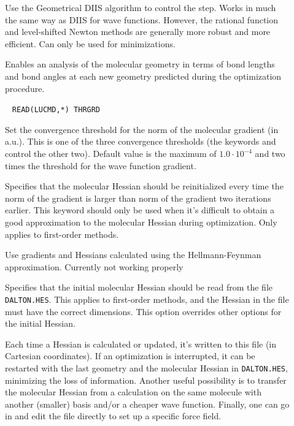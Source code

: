 \begin{description}
\item[]
Use the Geometrical DIIS\cite{pcppjms114}
algorithm to control the
step. Works in much the same way as DIIS for wave functions. However,
the rational function and level-shifted Newton methods are generally
more robust and more efficient. Can only be used for minimizations.

\item[]
Enables an analysis of the molecular geometry in terms of bond lengths
and bond angles at each new geometry predicted during the optimization
procedure.

\item[]\verb| |
\newline
\verb|READ(LUCMD,*) THRGRD|

Set the convergence threshold for the norm of the molecular gradient (in
a.u.). This is one of
the three convergence thresholds (the keywords  and
 control the other two). Default value is the maximum of
$1.0\cdot 10^{-4}$ and two times the threshold for the wave function
gradient.

\item[]
Specifies that the molecular Hessian should be
reinitialized every time the norm
of the gradient is larger than norm of the gradient two iterations
earlier. This keyword should only be used when it's difficult to
obtain a good approximation to the molecular Hessian during optimization. Only
applies to first-order methods.

\item[]
Use gradients and Hessians calculated using the Hellmann-Feynman
approximation. Currently not working properly

\item[]
Specifies that the initial molecular Hessian
should be read from the file \verb|DALTON.HES|. This applies to first-order
methods, and the Hessian in the file must have the correct
dimensions. This option overrides other options for the initial Hessian.

Each time a Hessian is calculated or updated,
it's written to this file (in Cartesian coordinates). If an
optimization is interrupted, it can be restarted with the
last geometry and the molecular Hessian in \verb|DALTON.HES|, minimizing the
loss of information. Another useful possibility is to transfer
the molecular Hessian from a calculation on the same molecule with another
(smaller) basis and/or a cheaper wave function. Finally, one can go in
and edit the file directly to set up a specific force field.


\end{description}
